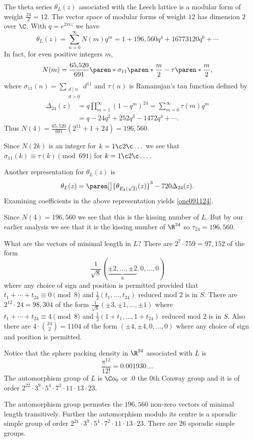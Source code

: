 The theta series $\theta_L(z)$ associated with the Leech lattice is a modular form of weight $\frac{24}{2}=12$.  The vector space of modular forms of weight $12$ has dimension $2$ over $\C$.  With $q=e^{2\pi iz}$ we have
\[ \theta_L(z) = \sum_{n=0}^\infty N(m) q^m = 1 + 196{,}560q^4 + 16773120q^6 + \dotsb \]
In fact, for even positive integers $m$,
\begin{equation} N(m) = \frac{65{,}520}{691}\paren*{\sigma_{11}\paren*{\frac{m}{2}}-\tau\paren*{\frac{m}{2}}} , \label{one091124} \end{equation}
where $\sigma_{11}(n) = \sum_{\substack{d\mid n\\d>0}}d^{11}$ and $\tau(n)$ is Ramanujan's tau function defined by
\begin{align*}
\Delta_{24}(z) &= q \prod_{m=1}^\infty(1-q^m)^{24} = \sum_{m=0}^\infty\tau(m)q^m \\
&= q - 24q^2 + 252q^3 - 1472q^4 + \dotsb .
\end{align*}
Thus $N(4)=\frac{65{,}520}{691}(2^{11}+1+24)=196{,}560$.

Since $N(2k)$ is an integer for $k=1\c 2\c \dotsc$ we see that $\sigma_{11}(k)\equiv\tau(k)\pmod{691}$ for $k=1\c 2\c \dotsc$.

Another representation for $\theta_L(z)$ is
\[ \theta_L(z) = \paren[\big]{\theta_{E_8(\sqrt2)}(z)}^3-720\Delta_{24}(z) . \]
Examining coefficients in the above representation yields \eqref{one091124}.

Since $N(4)=196{,}560$ we see that this is the kissing number of $L$.  But by our earlier analysis we see that it is the kissing number of $\R^{24}$ so $\tau_{24}=196{,}560$.

What are the vectors of minimal length in $L$?  There are $2^7\cdot759=97{,}152$ of the form
\[ \frac{1}{\sqrt8}(\underbrace{\pm2,\dotsc,\pm2}_8,0,\dotsc,0) \]
where any choice of sign and position is permitted provided that $t_1+\dotsb+t_{24}\equiv0\pmod8$ and $\frac12(t_1,\dotsc,t_{24})$ reduced mod $2$ is in $S$.  There are $2^{12}\cdot24=98{,}304$ of the form $\frac{1}{\sqrt8}(\pm3,\pm1,\dotsc,\pm1)$ where $t_1+\dotsb+t_{24}\equiv4\pmod8$ and $\frac12(1+t_1,\dotsc,1+t_{24})$ reduced mod $2$ is in $S$.  Also there are $4\cdot\binom{24}{2}=1104$ of the form $(\pm4,\pm4,0,\dotsc,0)$ where any choice of sign and position is permitted.

Notice that the sphere packing density in $\R^{24}$ associated with $L$ is
\[ \frac{\pi^{12}}{12!} = 0.001930\ldots . \]
The automorphism group of $L$ is $\Co_0$ or $.0$ the $0$th Conway group and it is of order $2^{22}\cdot3^9\cdot5^4\cdot7^2\cdot11\cdot13\cdot23$.

The automorphism group permutes the $196{,}560$ non-zero vectors of minimal length transitively.  Further the automorphism modulo its centre is a sporadic simple group of order $2^{21}\cdot3^9\cdot5^4\cdot7^2\cdot11\cdot13\cdot23$.  There are 26 sporadic simple groups.